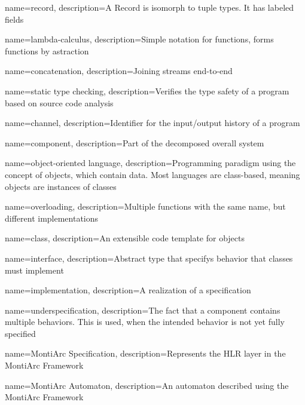 {
    name={record},
    description={A Record is isomorph to tuple types. It has labeled fields}
}

{
    name={lambda-calculus},
    description={Simple notation for functions, forms functions by astraction}
}

{
    name={concatenation},
    description={Joining streams end-to-end}
}

{
    name={static type checking},
    description={Verifies the type safety of a program based on source code analysis}
}

{
    name={channel},
    description={Identifier for the input/output history of a program}
}

{
    name={component},
    description={Part of the decomposed overall system}
}

{
    name={object-oriented language},
    description={Programming paradigm using the concept of objects, which contain data. Most languages are class-based, meaning objects are instances of classes}
}

{
    name={overloading},
    description={Multiple functions with the same name, but different implementations}
}

{
    name={class},
    description={An extensible code template for objects}
}

{
    name={interface},
    description={Abstract type that specifys behavior that classes must implement}
}

{
    name={implementation},
    description={A realization of a specification}
}

{
    name={underspecification},
    description={The fact that a component contains multiple behaviors. This is used, when the intended behavior is not yet fully specified}
}

{
    name={MontiArc Specification},
    description={Represents the HLR layer in the MontiArc Framework}
}

{
    name={MontiArc Automaton},
    description={An automaton described using the MontiArc Framework}
}

